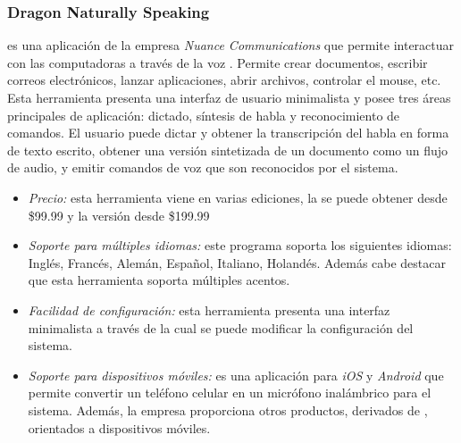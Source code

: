 \subsubsection{Dragon Naturally Speaking}
\label{sec:nuance}

 es una aplicaci\'on de la empresa \emph{Nuance Communications} 
que permite interactuar con las computadoras a trav\'es de la voz \cite{DragonNaturallySpeaking}. Permite
crear documentos, escribir correos electr\'onicos, lanzar aplicaciones, abrir archivos, controlar
el mouse, etc. Esta herramienta presenta una interfaz de usuario minimalista y posee tres
\'areas principales de aplicaci\'on: dictado, s\'intesis de habla y reconocimiento de comandos. 
El usuario puede dictar y obtener la transcripci\'on del habla en forma de texto escrito, obtener
una versi\'on sintetizada de un documento como un flujo de audio, y emitir comandos de voz que
son reconocidos por el sistema.

\begin{itemize}
    \item \emph{Precio:} esta herramienta viene en varias ediciones, la  se puede
        obtener desde \$99.99 y la versi\'on  desde \$199.99
    \item \emph{Soporte para m\'ultiples idiomas:} este programa soporta los siguientes idiomas: Ingl\'es, Franc\'es,
    Alem\'an, Espa\~nol, Italiano, Holand\'es. Adem\'as cabe destacar que esta herramienta soporta 
    m\'ultiples acentos.
    \item \emph{Facilidad de configuraci\'on:} esta herramienta presenta una interfaz minimalista a 
    trav\'es de la cual se puede modificar la configuraci\'on del sistema.
    \item \emph{Soporte para dispositivos m\'oviles:}  es una aplicaci\'on para 
    \emph{iOS} y \emph{Android} que permite convertir un tel\'efono celular en un micr\'ofono inal\'ambrico 
    para el sistema. Adem\'as, la empresa  proporciona otros productos, 
    derivados de , orientados a dispositivos m\'oviles.
\end{itemize}
